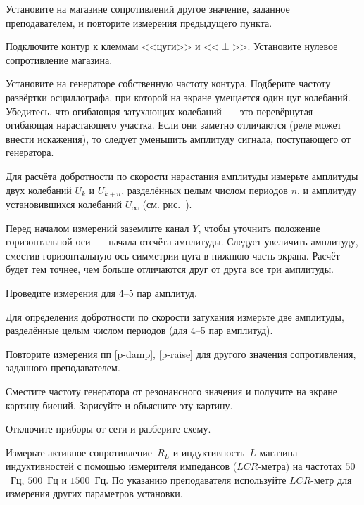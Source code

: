 \begin{lab:task}
	\item Установите на магазине сопротивлений другое значение, заданное
преподавателем, и повторите измерения предыдущего пункта. 


	\item Подключите контур к клеммам <<цуги>> и <<$\perp$>>. 
    Установите нулевое сопротивление магазина.

	\item Установите на генераторе собственную частоту контура. Подберите частоту 
    развёртки осциллографа, при которой на экране умещается один цуг колебаний. 
    Убедитесь, что огибающая затухающих колебаний~--- это перевёрнутая огибающая 
    нарастающего участка. Если они заметно отличаются (реле может внести искажения), 
    то следует уменьшить амплитуду сигнала, поступающего от генератора.

	\item \label{p-damp} Для расчёта добротности по скорости нарастания амплитуды измерьте
амплитуды двух колебаний $U_k$ и $U_{k+n}$, разделённых целым числом периодов $n$,
и амплитуду установившихся колебаний $U_{\infty}$ 
(см. рис.~).

Перед началом измерений заземлите канал $Y$, чтобы уточнить положение 
горизонтальной оси~--- начала отсчёта амплитуды. 
Следует увеличить амплитуду, сместив горизонтальную ось симметрии цуга в нижнюю часть 
экрана. Расчёт будет тем точнее, чем больше отличаются друг от друга все 
три амплитуды.

Проведите измерения для 4--5 пар амплитуд.

	\item \label{p-raise} Для определения добротности по скорости затухания измерьте две
амплитуды, разделённые целым числом периодов (для 4--5 пар амплитуд).

	\item Повторите измерения пп \ref{p-damp}, \ref{p-raise} для другого 
    значения сопротивления, заданного преподавателем.

	\item Сместите частоту генератора от резонансного значения и получите на
экране картину биений. Зарисуйте и объясните эту картину.

	\item Отключите приборы от сети и разберите схему.

	\item Измерьте активное сопротивление~$R_L$ и индуктивность~$L$ магазина
индуктивностей с помощью измерителя импедансов ($LCR$-метра) 
на частотах $50$~Гц, $500$~Гц и $1500$~Гц. По указанию преподавателя 
используйте $LCR$-метр для измерения других параметров установки.


\end{lab:task}
